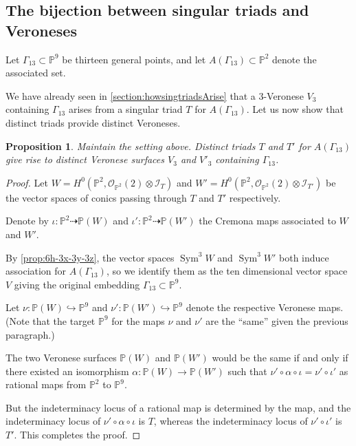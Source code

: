 \documentclass[reqno, 11pt]{amsart}
\theoremstyle{definition}
\theoremstyle{remark}
\numberwithin{equation}{section}
\numberwithin{thm}{section}
\numberwithin{prop}{section}
\numberwithin{lem}{section}
\numberwithin{cor}{section}
\numberwithin{conj}{section}
\numberwithin{defn}{section}
\renewcommand{\to}{\longrightarrow}
\newcommand {\from}{{\colon}}
\DeclareMathOperator\Sym{Sym}
\theoremstyle{plain}
\newtheorem{proposition}[theorem]{Proposition}
\theoremstyle{definition}
\newcommand\bp{{\mathbb P}}
\newcommand\so{{\mathscr O}}
\newcommand\sci{\mathscr I}
\begin{document}
\subsection{The bijection between singular triads and Veroneses} Let $\Gamma_{13} \subset \bp^{9}$ be thirteen general points, and let $A(\Gamma_{13}) \subset \bp^{2}$ denote the associated set. 

We have already seen in \autoref{section:howsingtriadsArise} that a $3$-Veronese $V_{3}$ containing $\Gamma_{13}$ arises from a singular triad $T$ for $A(\Gamma_{13})$. Let us now show that distinct triads provide distinct Veroneses.

\begin{proposition}\label{prop:distinctTriads}
Maintain the setting above. Distinct triads $T$ and $T'$ for $A(\Gamma_{13})$ give rise to distinct Veronese surfaces $V_{3}$ and $V'_{3}$ containing $\Gamma_{13}$. 
\end{proposition}

\begin{proof}
Let $W = H^{0}(\bp^{2}, \so_{\bp^{2}}(2)\otimes\sci_{T})$ and $W' = H^{0}(\bp^{2}, \so_{\bp^{2}}(2)\otimes\sci_{T'})$ be the vector spaces of conics passing through $T$ and $T'$ respectively.  

Denote by $\iota \from \bp^{2} \dashrightarrow \bp(W)$ and $\iota' \from \bp^{2} \dashrightarrow \bp(W')$ the Cremona maps associated to $W$ and $W'$. 

By \autoref{prop:6h-3x-3y-3z}, the vector spaces $\Sym^{3}W$ and $\Sym^{3}W'$ both induce association for $A(\Gamma_{13})$, so we identify them as the ten dimensional vector space $V$ giving the original embedding $\Gamma_{13} \subset \bp^{9}$. 

Let $\nu \from \bp(W) \hookrightarrow \bp^{9}$ and $\nu' \from \bp(W') \hookrightarrow \bp^{9}$ denote the respective Veronese maps. (Note that the target $\bp^{9}$ for the maps $\nu$ and $\nu'$ are the ``same'' given the previous paragraph.) 

The two Veronese surfaces $\bp(W)$ and $\bp(W')$ would be the same if and only if there existed an isomorphism $\alpha \from \bp(W) \to \bp(W')$ such that $\nu' \circ \alpha \circ \iota = \nu' \circ \iota'$ as rational maps from $\bp^{2}$ to $\bp^{9}$. 

But the indeterminacy locus of a rational map is determined by the map, and the indeterminacy locus of $\nu' \circ \alpha \circ \iota$ is $T$, whereas the indeterminacy locus of $\nu' \circ \iota'$ is $T'$. This completes the proof.
\end{proof}
\end{document}
